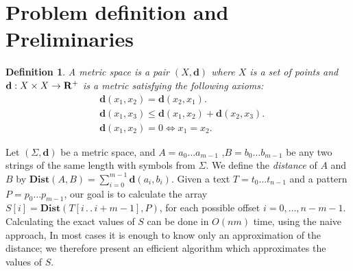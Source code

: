 \documentclass[11pt]{article}
\newcommand{\ldotdot}{\,.\,.\,}
\newtheorem{dfn}[thm]{Definition}
\newcommand{\dist}{\textbf{d}}
\newcommand{\Dist}{\textbf{Dist}}
\begin{document}
\section{Problem definition and Preliminaries }\label{s:def}
\begin{dfn} A {metric space}
 is a pair $(X,\dist)$ where $X$ is a set of points and $ \dist:X
\times X\rightarrow {\bf{R^+}}$ is a {\em metric} satisfying the
following axioms:
\begin{equation}
\begin{split}
&\dist(x_1,x_2)=\dist(x_2,x_1).\\
&\dist(x_1,x_3) \leq \dist(x_1,x_2)+\dist(x_2,x_3). \\
&\dist(x_1,x_2)=0 \Leftrightarrow x_1=x_2.
\end{split}
\end{equation}
\end{dfn}
Let $(\Sigma,\dist)$ be a metric space, and $A= a_0 \ldots
a_{m-1}$ ,$B= b_0 \ldots b_{m-1}$ be any two strings of the same
length with symbols from $\Sigma$. We define the \emph{distance}
of $A$ and $B$ by $\Dist(A,B)=\sum_{i=0}^{m-1}\dist(a_i,b_i) $.
Given a text $T=t_0 \ldots t_{n-1}$ and a pattern $P=p_0 \ldots
p_{m-1}$, our goal is to calculate the array $S[i]=\Dist(T[i
\ldotdot i+m-1],P)$, for each possible offset $i=0, \ldots,
n-m-1$. Calculating the exact values of $S$ can be done in $O(nm)$
time, using the naive approach, In most cases it is enough to know
only an approximation of the distance; we therefore present an
efficient algorithm which approximates the values of $S$.
\end{document}
